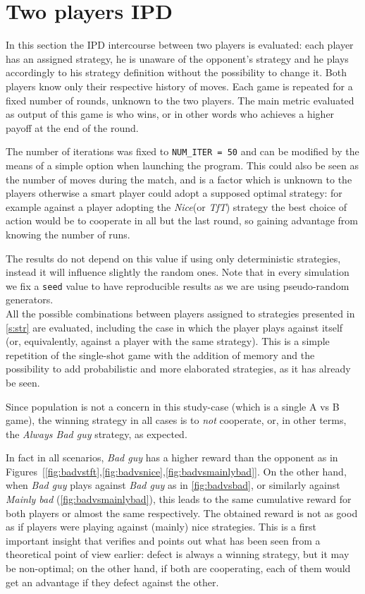 \documentclass[journal,a4paper,10pt,twoside]{IEEEtran} %
\begin{document}
\section{Two players IPD} \label{s:IPD2P}
In this section the IPD intercourse between two players is evaluated: each player has an assigned strategy, he is unaware of the opponent's strategy and he plays accordingly to his strategy definition without the possibility to change it. Both players know only their respective history of moves. Each game is repeated for a fixed number of rounds, unknown to the two players. The main metric evaluated as output of this game is who wins, or in other words who achieves a higher payoff at the end of the round.

The number of iterations was fixed to \texttt{NUM\_ITER = 50} and can be modified by the means of a simple option when launching the program. This could also be seen as the number of moves during the match, and is a factor which is unknown to the players otherwise a smart player could adopt a supposed optimal strategy: for example against a player adopting the \textit{Nice}(or \textit{TfT}) strategy the best choice of action would be to cooperate in all but the last round, so gaining advantage from knowing the number of runs. 

The results do not depend on this value if using only deterministic strategies, instead it will influence slightly the random ones. Note that in every simulation we fix a \texttt{seed} value to have reproducible results as we are using pseudo-random generators.
\\

All the possible combinations between players assigned to strategies presented in \autoref{s:str} are evaluated, including the case in which the player plays against itself (or, equivalently, against a player with the same strategy).
This is a simple repetition of the single-shot game with the addition of memory and the possibility to add probabilistic and more elaborated strategies, as it has already be seen.

Since population is not a concern in this study-case (which is a single A vs B game), the winning strategy in all cases is to \textit{not} cooperate, or, in other terms, the \textit{Always Bad guy} strategy, as expected.

In fact in all scenarios, \textit{Bad guy} has a higher reward than the opponent as in Figures~[\ref{fig:badvstft},\ref{fig:badvsnice},\ref{fig:badvsmainlybad}]. 
On the other hand, when \textit{Bad guy} plays against \textit{Bad guy} as in \autoref{fig:badvsbad}, or similarly against \textit{Mainly bad} (\autoref{fig:badvsmainlybad}), this leads to the same cumulative reward for both players or almost the same respectively. The obtained reward is not as good as if players were playing against (mainly) nice strategies. This is a first important insight that verifies and points out what has been seen from a theoretical point of view earlier: defect is always a winning strategy, but it may be non-optimal; on the other hand, if both are cooperating, each of them would get an advantage if they defect against the other.
\end{document}

